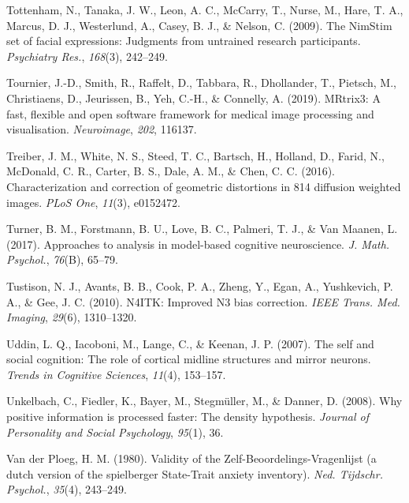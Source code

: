 \documentclass[11pt,american,a4paper,oneside,]{memoir} %
\begin{document}
\leavevmode\hypertarget{ref-Tottenham2009-vn}{}%
Tottenham, N., Tanaka, J. W., Leon, A. C., McCarry, T., Nurse, M., Hare, T. A., Marcus, D. J., Westerlund, A., Casey, B. J., \& Nelson, C. (2009). The NimStim set of facial expressions: Judgments from untrained research participants. \emph{Psychiatry Res.}, \emph{168}(3), 242--249.

\leavevmode\hypertarget{ref-Tournier2019-hh}{}%
Tournier, J.-D., Smith, R., Raffelt, D., Tabbara, R., Dhollander, T., Pietsch, M., Christiaens, D., Jeurissen, B., Yeh, C.-H., \& Connelly, A. (2019). MRtrix3: A fast, flexible and open software framework for medical image processing and visualisation. \emph{Neuroimage}, \emph{202}, 116137.

\leavevmode\hypertarget{ref-Treiber2016-mc}{}%
Treiber, J. M., White, N. S., Steed, T. C., Bartsch, H., Holland, D., Farid, N., McDonald, C. R., Carter, B. S., Dale, A. M., \& Chen, C. C. (2016). Characterization and correction of geometric distortions in 814 diffusion weighted images. \emph{PLoS One}, \emph{11}(3), e0152472.

\leavevmode\hypertarget{ref-Turner2017-fi}{}%
Turner, B. M., Forstmann, B. U., Love, B. C., Palmeri, T. J., \& Van Maanen, L. (2017). Approaches to analysis in model-based cognitive neuroscience. \emph{J. Math. Psychol.}, \emph{76}(B), 65--79.

\leavevmode\hypertarget{ref-Tustison2010-tk}{}%
Tustison, N. J., Avants, B. B., Cook, P. A., Zheng, Y., Egan, A., Yushkevich, P. A., \& Gee, J. C. (2010). N4ITK: Improved N3 bias correction. \emph{IEEE Trans. Med. Imaging}, \emph{29}(6), 1310--1320.

\leavevmode\hypertarget{ref-uddin2007self}{}%
Uddin, L. Q., Iacoboni, M., Lange, C., \& Keenan, J. P. (2007). The self and social cognition: The role of cortical midline structures and mirror neurons. \emph{Trends in Cognitive Sciences}, \emph{11}(4), 153--157.

\leavevmode\hypertarget{ref-unkelbach2008positive}{}%
Unkelbach, C., Fiedler, K., Bayer, M., Stegmüller, M., \& Danner, D. (2008). Why positive information is processed faster: The density hypothesis. \emph{Journal of Personality and Social Psychology}, \emph{95}(1), 36.

\leavevmode\hypertarget{ref-Van_der_Ploeg1980-tq}{}%
Van der Ploeg, H. M. (1980). Validity of the Zelf-Beoordelings-Vragenlijst (a dutch version of the spielberger State-Trait anxiety inventory). \emph{Ned. Tijdschr. Psychol.}, \emph{35}(4), 243--249.
\end{document}
